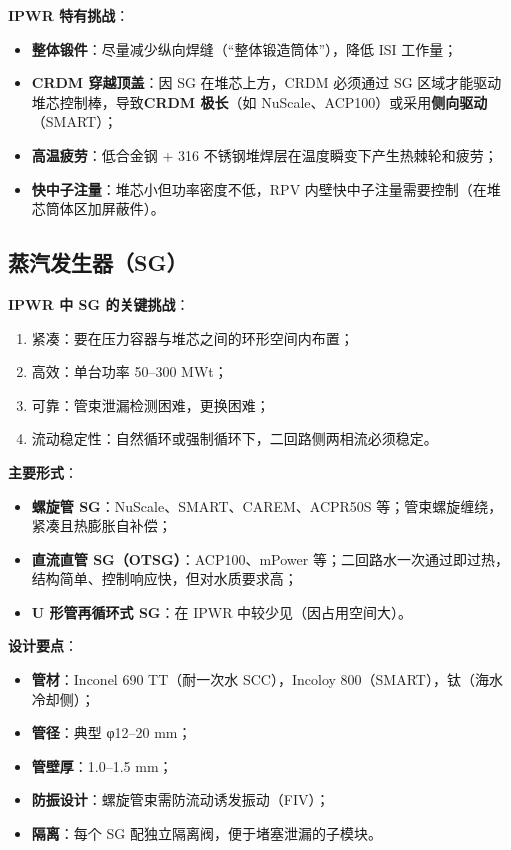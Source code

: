 \documentclass[
  UTF8,
  scheme=plain,
  fontsize=10pt,
  openany
]{ctexbook}
\begin{document}
\textbf{IPWR 特有挑战}：

\begin{itemize}
\tightlist
\item
  \textbf{整体锻件}：尽量减少纵向焊缝（``整体锻造筒体''），降低 ISI
  工作量；
\item
  \textbf{CRDM 穿越顶盖}：因 SG 在堆芯上方，CRDM 必须通过 SG
  区域才能驱动堆芯控制棒，导致\textbf{CRDM 极长}（如
  NuScale、ACP100）或采用\textbf{侧向驱动}（SMART）；
\item
  \textbf{高温疲劳}：低合金钢 + 316
  不锈钢堆焊层在温度瞬变下产生热棘轮和疲劳；
\item
  \textbf{快中子注量}：堆芯小但功率密度不低，RPV
  内壁快中子注量需要控制（在堆芯筒体区加屏蔽件）。
\end{itemize}

\subsection{蒸汽发生器（SG）}\label{ux84b8ux6c7dux53d1ux751fux5668sg}

\textbf{IPWR 中 SG 的关键挑战}：

\begin{enumerate}
\def\labelenumi{\arabic{enumi}.}
\tightlist
\item
  紧凑：要在压力容器与堆芯之间的环形空间内布置；
\item
  高效：单台功率 50--300 MWt；
\item
  可靠：管束泄漏检测困难，更换困难；
\item
  流动稳定性：自然循环或强制循环下，二回路侧两相流必须稳定。
\end{enumerate}

\textbf{主要形式}：

\begin{itemize}
\tightlist
\item
  \textbf{螺旋管 SG}：NuScale、SMART、CAREM、ACPR50S
  等；管束螺旋缠绕，紧凑且热膨胀自补偿；
\item
  \textbf{直流直管 SG（OTSG）}：ACP100、mPower
  等；二回路水一次通过即过热，结构简单、控制响应快，但对水质要求高；
\item
  \textbf{U 形管再循环式 SG}：在 IPWR 中较少见（因占用空间大）。
\end{itemize}

\textbf{设计要点}：

\begin{itemize}
\tightlist
\item
  \textbf{管材}：Inconel 690 TT（耐一次水 SCC），Incoloy
  800（SMART），钛（海水冷却侧）；
\item
  \textbf{管径}：典型 φ12--20 mm；
\item
  \textbf{管壁厚}：1.0--1.5 mm；
\item
  \textbf{防振设计}：螺旋管束需防流动诱发振动（FIV）；
\item
  \textbf{隔离}：每个 SG 配独立隔离阀，便于堵塞泄漏的子模块。
\end{itemize}
\end{document}
